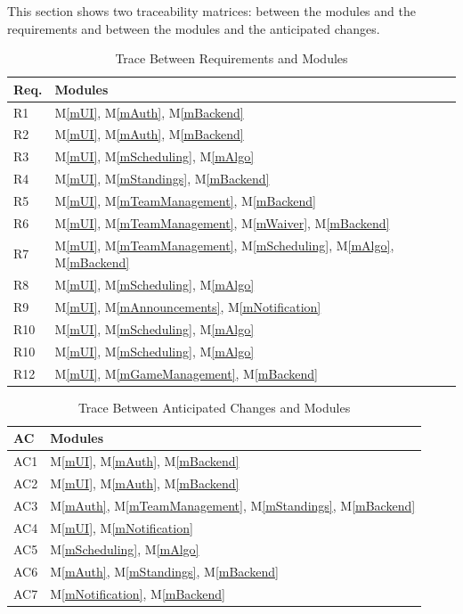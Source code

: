 \documentclass[12pt, titlepage]{article}
\newcommand{\acref}[1]{AC\ref{#1}}
\newcommand{\mref}[1]{M\ref{#1}}
\begin{document}
This section shows two traceability matrices: between the modules and the
requirements and between the modules and the anticipated changes.

\begin{table}[H]
\centering
\begin{tabular}{p{} p{}}
\toprule
\textbf{Req.} & \textbf{Modules}\\
\midrule
R1 & \mref{mUI}, \mref{mAuth}, \mref{mBackend}\\
R2 & \mref{mUI}, \mref{mAuth}, \mref{mBackend}\\
R3 & \mref{mUI}, \mref{mScheduling}, \mref{mAlgo}\\
R4 & \mref{mUI}, \mref{mStandings}, \mref{mBackend}\\
R5 & \mref{mUI}, \mref{mTeamManagement}, \mref{mBackend}\\
R6 & \mref{mUI}, \mref{mTeamManagement}, \mref{mWaiver}, \mref{mBackend}\\
R7 & \mref{mUI}, \mref{mTeamManagement}, \mref{mScheduling}, \mref{mAlgo}, \mref{mBackend}\\
R8 & \mref{mUI}, \mref{mScheduling}, \mref{mAlgo}\\
R9 & \mref{mUI}, \mref{mAnnouncements}, \mref{mNotification}\\
R10 & \mref{mUI}, \mref{mScheduling}, \mref{mAlgo}\\
R10 & \mref{mUI}, \mref{mScheduling}, \mref{mAlgo}\\
R12 & \mref{mUI}, \mref{mGameManagement}, \mref{mBackend}\\

\bottomrule
\end{tabular}
\caption{Trace Between Requirements and Modules}
\label{TblRT}
\end{table}

\begin{table}[H]
\centering
\begin{tabular}{p{} p{}}
\toprule
\textbf{AC} & \textbf{Modules}\\
\midrule
AC1 & \mref{mUI}, \mref{mAuth}, \mref{mBackend}\\
AC2 & \mref{mUI}, \mref{mAuth}, \mref{mBackend}\\
AC3 & \mref{mAuth}, \mref{mTeamManagement}, \mref{mStandings}, \mref{mBackend}\\
AC4 & \mref{mUI}, \mref{mNotification}\\
AC5 & \mref{mScheduling}, \mref{mAlgo}\\
AC6 & \mref{mAuth}, \mref{mStandings}, \mref{mBackend}\\
AC7 & \mref{mNotification}, \mref{mBackend}\\
\bottomrule
\end{tabular}
\caption{Trace Between Anticipated Changes and Modules}
\label{TblACT}
\end{table}
\end{document}
